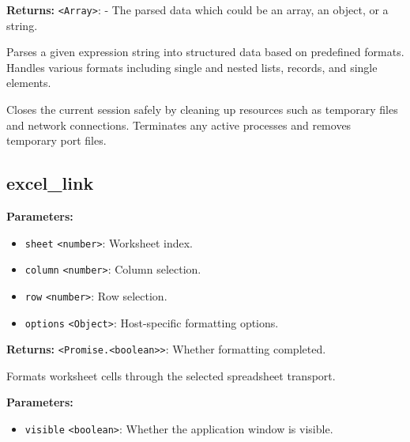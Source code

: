 \documentclass[12pt,a4paper]{article}
\begin{document}
\noindent \textbf{Returns:} \texttt{<Array>}: - The parsed data which could be an array, an object, or a string.

\noindent Parses a given expression string into structured data based on predefined formats.
Handles various formats including single and nested lists, records, and single elements.

\vspace{5mm}
\noindent {}


\noindent Closes the current session safely by cleaning up resources such as temporary files and network connections.
Terminates any active processes and removes temporary port files.


\subsection{excel\_link}
\vspace{5mm}
\noindent {}


\noindent \textbf{Parameters:}
\begin{itemize}
  \item \texttt{sheet} \texttt{<number>}: Worksheet index.
  \item \texttt{column} \texttt{<number>}: Column selection.
  \item \texttt{row} \texttt{<number>}: Row selection.
  \item \texttt{options} \texttt{<Object>}: Host-specific formatting options.
\end{itemize}

\noindent \textbf{Returns:} \texttt{<Promise.<boolean>>}: Whether formatting completed.

\noindent Formats worksheet cells through the selected spreadsheet transport.

\vspace{5mm}
\noindent {}


\noindent \textbf{Parameters:}
\begin{itemize}
  \item \texttt{visible} \texttt{<boolean>}: Whether the application window is visible.
\end{itemize}
\end{document}
